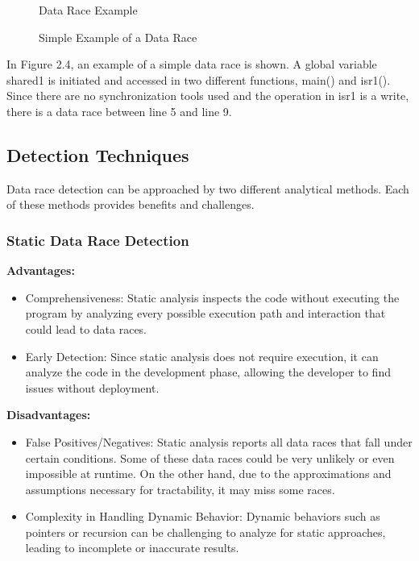 \documentclass[
fancyheadings, %
%
%
]{stsreprt}
\begin{document}
{		\begin{figure}[H]
			\centering
			\begin{algorithm}[H]
				\caption{Data Race Example}
				
				\BlankLine
				
				\BlankLine
			\end{algorithm}
			\caption{Simple Example of a Data Race}
		\end{figure}
		
		In Figure 2.4, an example of a simple data race is shown. A global variable shared1 is initiated and accessed in two different functions, main() and isr1(). Since there are no synchronization tools used and the operation in isr1 is a write, there is a data race between line 5 and line 9.
		
		\subsection{Detection Techniques}
		
		Data race detection can be approached by two different analytical methods. Each of these methods provides benefits and challenges.
		
		\subsubsection{Static Data Race Detection \cite{wang2020}}
		\textbf{Advantages:}
		\begin{itemize}
			\item Comprehensiveness: Static analysis inspects the code without executing the program by analyzing every possible execution path and interaction that could lead to data races.
			\item Early Detection: Since static analysis does not require execution, it can analyze the code in the development phase, allowing the developer to find issues without deployment.
		\end{itemize}
		\textbf{Disadvantages:}
		\begin{itemize}
			\item False Positives/Negatives: Static analysis reports all data races that fall under certain conditions. Some of these data races could be very unlikely or even impossible at runtime. On the other hand, due to the approximations and assumptions necessary for tractability, it may miss some races.
			\item Complexity in Handling Dynamic Behavior: Dynamic behaviors such as pointers or recursion can be challenging to analyze for static approaches, leading to incomplete or inaccurate results.
		\end{itemize}
		
}
\end{document}
